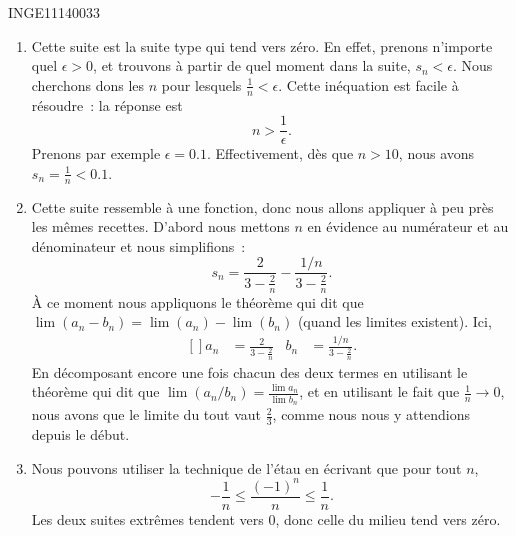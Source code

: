 

\begin{corrige}{INGE11140033}

	\begin{enumerate}

		\item
			Cette suite est la suite type qui tend vers zéro. En effet, prenons n'importe quel $\epsilon>0$, et trouvons à partir de quel moment dans la suite, $s_n<\epsilon$. Nous cherchons dons les $n$ pour lesquels $\frac{1}{ n }<\epsilon$. Cette inéquation est facile à résoudre~: la réponse est
			\begin{equation}
				n>\frac{1}{ \epsilon }.
			\end{equation}
			Prenons par exemple $\epsilon=0.1$. Effectivement, dès que $n>10$, nous avons $s_n=\frac{1}{ n }<0.1$.

		\item
			Cette suite ressemble à une fonction, donc nous allons appliquer à peu près les mêmes recettes. D'abord nous mettons $n$ en évidence au numérateur et au dénominateur et nous simplifions~:
			\begin{equation}
				s_n=\frac{ 2 }{ 3-\frac{ 2 }{ n } }-\frac{ 1/n }{ 3-\frac{ 2 }{ n } }.
			\end{equation}
			À ce moment nous appliquons le théorème qui dit que $\lim(a_n-b_n)=\lim(a_n)-\lim(b_n)$ (quand les limites existent). Ici,
			\begin{equation}
				\begin{aligned}[]
					a_n&=\frac{ 2 }{ 3-\frac{ 2 }{ n } } & b_n&=\frac{ 1/n }{ 3-\frac{ 2 }{ n } }.
				\end{aligned}
			\end{equation}
			En décomposant encore une fois chacun des deux termes en utilisant le théorème qui dit que $\lim(a_n/b_n)=\frac{ \lim a_n }{ \lim b_n }$, et en utilisant le fait que $\frac{1}{ n }\to 0$, nous avons que le limite du tout vaut $\frac{ 2 }{ 3 }$, comme nous nous y attendions depuis le début.

		\item
			Nous pouvons utiliser la technique de l'étau en écrivant que pour tout $n$,
			\begin{equation}
				-\frac{1}{ n }\leq \frac{ (-1)^n }{ n }\leq \frac{1}{ n }.
			\end{equation}
			Les deux suites extrêmes tendent vers $0$, donc celle du milieu tend vers zéro.

	\end{enumerate}

\end{corrige}
